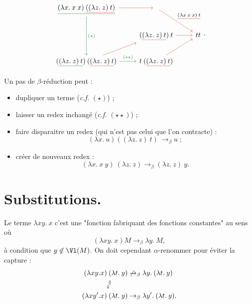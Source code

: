\documentclass{../notes}
\newcommand\colorunderline[2]{
  {\color{#1}\underline{{\color{black} #2}}}
}
\begin{document}
  \begin{exm} \label{exm:multiple-paths-beta}
    \[
    \begin{tikzcd}
      \colorunderline{deepgreen}{(\lambda x.\: x \: x) \: \colorunderline{nicered}{((\lambda z.\: z) \: t)}}
      \arrow[deepgreen]{dd}{(\star)}
      \arrow[nicered]{r}{}
      & \arrow[nicered]{dr}{} \colorunderline{nicered}{(\lambda x\: x \: x) \: t}\\
      & (\colorunderline{nicered}{(\lambda z.\: z)\: t}) \: t \arrow[nicered]{r}{} & t t\\
      (\colorunderline{deepgreen}{(\lambda z.\: z) \: t}) \: (\colorunderline{nicered}{(\lambda z.\: z) \: t}) \arrow[deepgreen]{r}{(\star\star)} \arrow[nicered]{ur}{} & t \: (\colorunderline{nicered}{(\lambda z.\: z)\: t}) \arrow[nicered]{ur}{}
    \end{tikzcd}
    .\]
  \end{exm}

  Un pas de $\beta$-réduction peut :
  \begin{itemize}
    \item dupliquer un terme (\textit{c.f.} $(\star)$) ;
    \item laisser un redex inchangé (\textit{c.f.} $(\star\star)$) ;
    \item faire disparaitre un redex (qui n'est pas celui que l'on contracte) :
      \[
        (\lambda x. \: u) ((\lambda z. \: z) \: t) \: \to_\beta u \;
      ;\]
    \item créer de nouveaux redex :
      \[
        (\lambda x. \: x \: y) \: (\lambda z. \: z) \to_\beta (\lambda z. \: z)\: y
      .\]
  \end{itemize}

  \section{Substitutions.}

  \begin{exm}
    Le terme $\lambda xy. \: x$ c'est une "fonction fabriquant des fonctions constantes" au sens où  \[
      (\lambda x y. \: x) M \to_\beta \lambda y.\: M
    ,\] 
    à condition que $y \not\in \Vl(M)$.
    On doit cependant  $\alpha$-renommer pour éviter la capture :
    \begin{align*}
      (\lambda x y. x) &\: ( \lambda t. \: y) \not\to_\beta \lambda y.\: (\lambda t.\: y)\\
                       &\vertical{=_\alpha}\\
      (\lambda x y'. x) &\: ( \lambda t. \: y) \to_\beta \lambda y'.\: (\lambda t.\: y)
    .\end{align*}
  \end{exm}
\end{document}
